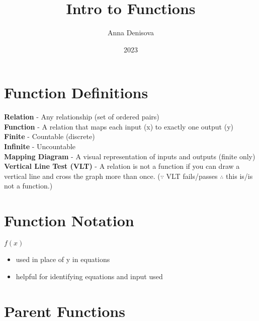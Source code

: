 \documentclass{article}
\title{Intro to Functions}
\author{Anna Denisova}
\date{2023}
\begin{document}
\maketitle
\tableofcontents


\newpage
\section{Function Definitions}

\textbf{Relation} - Any relationship (set of ordered pairs) \\
\textbf{Function} - A relation that maps each input (x) to exactly one output (y)\\
\textbf{Finite} - Countable (discrete)\\
\textbf{Infinite} - Uncountable \\
\textbf{Mapping Diagram} - A visual representation of inputs and outputs (finite only)\\
\textbf{Vertical Line Test (VLT)} - A relation is not a function if you can draw a vertical line and cross the graph more than once. ($\because$ VLT fails/passes $\therefore$ this is/is not a function.)\\

\newpage
\section{Function Notation}

\textbf{$f(x)$}
\begin{itemize}
    \item used in place of y in equations
    \item helpful for identifying equations and input used
\end{itemize}



\newpage
\section{Parent Functions}
\end{document}
